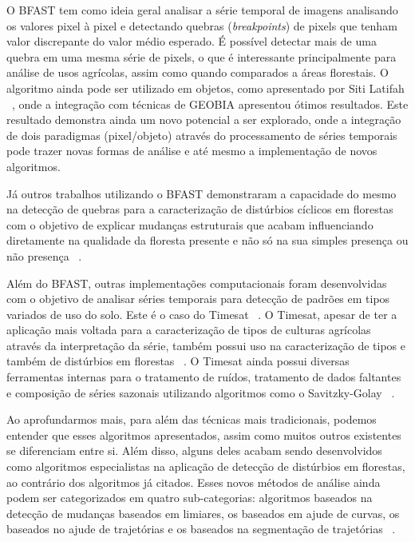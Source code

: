 \documentclass[twocolumn]{article}
\begin{document}
\par
O BFAST tem como ideia geral analisar a série temporal de imagens analisando os valores pixel à pixel e detectando quebras (\textit{breakpoints}) de pixels que tenham valor discrepante do valor médio esperado. É possível detectar mais de uma quebra em uma mesma série de pixels, o que é interessante principalmente para análise de usos agrícolas, assim como quando comparados a áreas florestais. O algoritmo ainda pode ser utilizado em objetos, como apresentado por Siti Latifah ~\cite{LATIFAH2016}, onde a integração com técnicas de GEOBIA apresentou ótimos resultados. Este resultado demonstra ainda um novo potencial a ser explorado, onde a integração de dois paradigmas (pixel/objeto) através do processamento de séries temporais pode trazer novas formas de análise e até mesmo a implementação de novos algoritmos.
\par
Já outros trabalhos utilizando o BFAST demonstraram a capacidade do mesmo na detecção de quebras para a caracterização de distúrbios cíclicos em florestas com o objetivo de explicar mudanças estruturais que acabam influenciando diretamente na qualidade da floresta presente e não só na sua simples presença ou não presença ~\cite{JAKOVAC2017, DUTRIEUX2016112}.
\par
Além do BFAST, outras implementações computacionais foram desenvolvidas com o objetivo de analisar séries temporais para detecção de padrões em tipos variados de uso do solo. Este é o caso do Timesat ~\cite{Jnsson2004TIMESATA}. O Timesat, apesar de ter a aplicação mais voltada para a caracterização de tipos de culturas agrícolas através da interpretação da série, também possui uso na caracterização de tipos e também de distúrbios em florestas ~\cite{Wenbo2017}. O Timesat ainda possui diversas ferramentas internas para o tratamento de ruídos, tratamento de dados faltantes e composição de séries sazonais utilizando algoritmos como o Savitzky-Golay ~\cite{Savitzky1964}.
\par
Ao aprofundarmos mais, para além das técnicas mais tradicionais, podemos entender que esses algoritmos apresentados, assim como muitos outros existentes se diferenciam entre si. Além disso, alguns deles acabam sendo desenvolvidos como algoritmos especialistas na aplicação de detecção de distúrbios em florestas, ao contrário dos algoritmos já citados. Esses novos métodos de análise ainda podem ser categorizados em quatro sub-categorias: algoritmos baseados na detecção de mudanças baseados em limiares, os baseados em ajude de curvas, os baseados no ajude de trajetórias e os baseados na segmentação de trajetórias ~\cite{Banskota2014, Hirschmugl2017}.
\end{document}
